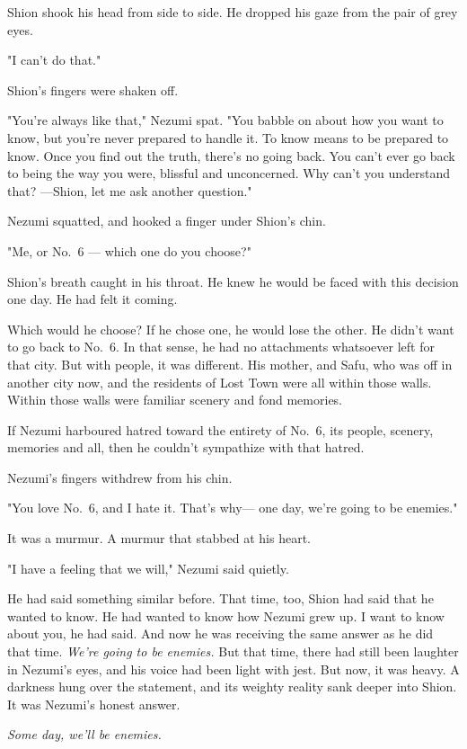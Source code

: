Shion shook his head from side to side. He dropped his gaze from the
pair of grey eyes.

"I can't do that."

Shion's fingers were shaken off.

"You're always like that," Nezumi spat. "You babble on about how you
want to know, but you're never prepared to handle it. To know means to
be prepared to know. Once you find out the truth, there's no going back.
You can't ever go back to being the way you were, blissful and
unconcerned. Why can't you understand that? ---Shion, let me ask another
question."

Nezumi squatted, and hooked a finger under Shion's chin.

"Me, or No.~6 --- which one do you choose?"

Shion's breath caught in his throat. He knew he would be faced with this
decision one day. He had felt it coming.

Which would he choose? If he chose one, he would lose the other. He
didn't want to go back to No.~6. In that sense, he had no attachments
whatsoever left for that city. But with people, it was different. His
mother, and Safu, who was off in another city now, and the residents of
Lost Town were all within those walls. Within those walls were familiar
scenery and fond memories.

If Nezumi harboured hatred toward the entirety of No.~6, its people,
scenery, memories and all, then he couldn't sympathize with that hatred.

Nezumi's fingers withdrew from his chin.

"You love No.~6, and I hate it. That's why--- one day, we're going to be
enemies."

It was a murmur. A murmur that stabbed at his heart.

"I have a feeling that we will," Nezumi said quietly.

He had said something similar before. That time, too, Shion had said
that he wanted to know. He had wanted to know how Nezumi grew up. I want
to know about you, he had said. And now he was receiving the same answer
as he did that time. \emph{We're going to be enemies.} But that time, there had
still been laughter in Nezumi's eyes, and his voice had been light with
jest. But now, it was heavy. A darkness hung over the statement, and its
weighty reality sank deeper into Shion. It was Nezumi's honest answer.

\emph{Some day, we'll be enemies.}

